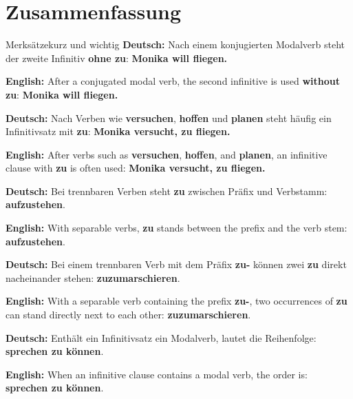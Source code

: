 \documentclass[a4paper,11pt]{article}
\newcommand{\GermanText}[1]{\textbf{Deutsch: }#1\par}
\newcommand{\EnglishText}[1]{{\small\color{SoftGray}\textbf{English: }#1\par}}
\begin{document}
    \section{Zusammenfassung}

        \begin{grammarentry}{Merksätze}{kurz und wichtig}
            \GermanText{Nach einem konjugierten Modalverb steht der zweite Infinitiv \textbf{ohne zu}: \textbf{Monika will fliegen.}}
            \EnglishText{After a conjugated modal verb, the second infinitive is used \textbf{without zu}: \textbf{Monika will fliegen.}}

            \GermanText{Nach Verben wie \textbf{versuchen}, \textbf{hoffen} und \textbf{planen} steht häufig ein Infinitivsatz mit \textbf{zu}: \textbf{Monika versucht, zu fliegen.}}
            \EnglishText{After verbs such as \textbf{versuchen}, \textbf{hoffen}, and \textbf{planen}, an infinitive clause with \textbf{zu} is often used: \textbf{Monika versucht, zu fliegen.}}

            \GermanText{Bei trennbaren Verben steht \textbf{zu} zwischen Präfix und Verbstamm: \textbf{aufzustehen}.}
            \EnglishText{With separable verbs, \textbf{zu} stands between the prefix and the verb stem: \textbf{aufzustehen}.}

            \GermanText{Bei einem trennbaren Verb mit dem Präfix \textbf{zu-} können zwei \textbf{zu} direkt nacheinander stehen: \textbf{zuzumarschieren}.}
            \EnglishText{With a separable verb containing the prefix \textbf{zu-}, two occurrences of \textbf{zu} can stand directly next to each other: \textbf{zuzumarschieren}.}

            \GermanText{Enthält ein Infinitivsatz ein Modalverb, lautet die Reihenfolge: \textbf{sprechen zu können}.}
            \EnglishText{When an infinitive clause contains a modal verb, the order is: \textbf{sprechen zu können}.}
        \end{grammarentry}
\end{document}
